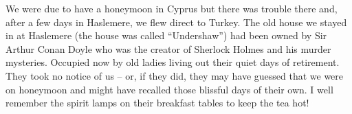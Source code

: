 We were due to have a honeymoon in Cyprus but there was trouble there
and, after a few days in Haslemere, we flew direct to Turkey. The old
house we stayed in at Haslemere (the house was called ``Undershaw'')
had been owned by Sir Arthur Conan Doyle who was the creator of
Sherlock Holmes and his murder mysteries. Occupied now by old ladies
living out their quiet days of retirement. They took no notice of us
-- or, if they did, they may have guessed that we were on honeymoon
and might have recalled those blissful days of their own. I well
remember the spirit lamps on their breakfast tables to keep the tea
hot!



